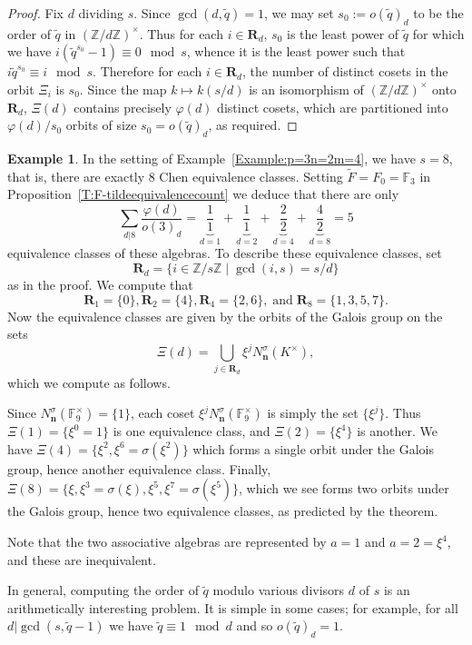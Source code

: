 \documentclass[11pt]{amsart}
\theoremstyle{plain}
\theoremstyle{definition}
\newtheorem{example}[theorem]{Example}
\numberwithin{equation}{section}
\numberwithin{figure}{section}
\newcommand{\FF}{\mathbb{F}}
\newcommand{\de}{{\mathbf{n}}}  %
\newcommand{\Z}{\mathbb{Z}} %
\begin{document}
\begin{proof}
    Fix $d$ dividing $s$.  Since  $\gcd(d,\tilde{q})=1$, we may set $s_0:=o(\tilde{q})_d$ to be the order of $\tilde{q}$ in $(\Z/d\Z)^\times$. Thus for each $i\in {\mathbf R}_d$,  $s_0$ is the least power of $\tilde{q}$ for which we have $i(\tilde{q}^{s_0}-1)\equiv 0\mod s$, whence it is the least power such that $i\tilde{q}^{s_0}\equiv i\mod s$. Therefore for each $i\in {\mathbf R}_d$, the number of distinct cosets in the orbit $\Xi_i$ is $s_0$.  Since the map $k\mapsto k(s/d)$ is an isomorphism of $(\Z/d\Z)^\times$ onto ${\mathbf R}_d$, $\Xi(d)$ contains precisely $\varphi(d)$ distinct cosets, which are partitioned into $\varphi(d)/s_0$ orbits of size $s_0=o(\tilde{q})_d$, as required.
\end{proof}


\begin{example}
    In the setting of Example~\ref{Example:p=3n=2m=4}, we have $s=8$, that is, there are exactly $8$ Chen equivalence classes. Setting $\tilde{F}=F_0=\FF_3$ in Proposition~\ref{T:F-tildeequivalencecount} we deduce that there are only
    $$
    \sum_{d|8}\frac{\varphi(d)}{o(3)_d} = \underbrace{\frac{1}{1}}_{d=1}+\underbrace{\frac{1}{1}}_{d=2}+\underbrace{\frac{2}{2}}_{d=4}+
    \underbrace{\frac{4}{2}}_{d=8}=5
    $$
    equivalence classes of these algebras.  To describe these equivalence classes, set $${\mathbf R}_d = \{i\in \Z/s\Z\mid \gcd(i,s)=s/d\}$$ as in the proof.  We compute that
    $$
    {\mathbf R}_1=\{0\}, {\mathbf R}_2=\{4\}, {\mathbf R}_4=\{2,6\},\;\text{and}\; {\mathbf R}_8=\{1,3,5,7\}.
    $$
    Now the equivalence classes are given by the orbits of the Galois group on the sets
    $$
    \Xi(d) = \bigcup_{j\in \mathbf{R}_d} \xi^j N^\sigma_\de(K^\times),
    $$
    which we compute as follows.

    Since $N_\de^\sigma(\FF_9^\times)=\{1\}$, each coset $\xi^jN_\de^\sigma(\FF_9^\times)$ is simply the set $\{\xi^j\}$.  Thus $\Xi(1) = \{\xi^0=1\}$ is one equivalence class, and $\Xi(2)=\{\xi^4\}$ is another.  We have $\Xi(4)=\{\xi^2,\xi^6=\sigma(\xi^2)\}$ which forms a single orbit under the Galois group, hence another equivalence class.  Finally, $\Xi(8)=\{\xi,\xi^3=\sigma(\xi),\xi^5,\xi^7=\sigma(\xi^5)\}$, which we see forms two orbits under the Galois group, hence two equivalence classes, as predicted by the theorem.

    Note that the two associative algebras are represented by $a=1$ and $a=2=\xi^4$, and these are inequivalent.
\end{example}

In general, computing the order of $\tilde{q}$ modulo various divisors $d$ of $s$ is an arithmetically interesting problem.  It is simple in some cases; for example, for all $d|\gcd(s,\tilde{q}-1)$ we have $\tilde{q}\equiv 1\mod d$ and so $o(\tilde{q})_d=1$.
\end{document}
